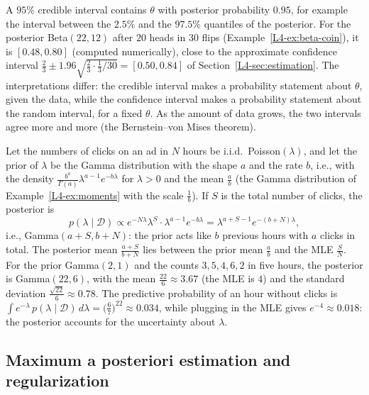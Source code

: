 \begin{example}\label{L4-ex:credible}
    A $95\%$ credible interval contains $\theta$ with posterior probability $0.95$, for example the interval between the $2.5\%$ and the $97.5\%$ quantiles of the posterior. For the posterior Beta$(22, 12)$ after $20$ heads in $30$ flips (Example~\ref{L4-ex:beta-coin}), it is $[0.48, 0.80]$ (computed numerically), close to the approximate confidence interval $\frac{2}{3} \pm 1.96\sqrt{\frac{2}{3} \cdot \frac{1}{3}/30} = [0.50, 0.84]$ of Section~\ref{L4-sec:estimation}. The interpretations differ: the credible interval makes a probability statement about $\theta$, given the data, while the confidence interval makes a probability statement about the random interval, for a fixed $\theta$. As the amount of data grows, the two intervals agree more and more (the Bernstein--von Mises theorem).
\end{example}

\begin{example}\label{L4-ex:gamma-poisson}
    Let the numbers of clicks on an ad in $N$ hours be i.i.d.\ Poisson$(\lambda)$, and let the prior of $\lambda$ be the Gamma distribution with the shape $a$ and the rate $b$, i.e., with the density $\frac{b^a}{\Gamma(a)}\lambda^{a-1}e^{-b\lambda}$ for $\lambda > 0$ and the mean $\frac{a}{b}$ (the Gamma distribution of Example~\ref{L4-ex:moments} with the scale $\frac{1}{b}$). If $S$ is the total number of clicks, the posterior is
    \[p(\lambda \mid \mathcal{D}) \propto e^{-N\lambda}\lambda^S \cdot \lambda^{a-1}e^{-b\lambda} = \lambda^{a + S - 1}e^{-(b + N)\lambda},\]
    i.e., Gamma$(a + S, b + N)$: the prior acts like $b$ previous hours with $a$ clicks in total. The posterior mean $\frac{a + S}{b + N}$ lies between the prior mean $\frac{a}{b}$ and the MLE $\frac{S}{N}$. For the prior Gamma$(2, 1)$ and the counts $3, 5, 4, 6, 2$ in five hours, the posterior is Gamma$(22, 6)$, with the mean $\frac{22}{6} \approx 3.67$ (the MLE is $4$) and the standard deviation $\frac{\sqrt{22}}{6} \approx 0.78$. The predictive probability of an hour without clicks is $\int e^{-\lambda}\,p(\lambda \mid \mathcal{D})\, d\lambda = \big(\frac{6}{7}\big)^{22} \approx 0.034$, while plugging in the MLE gives $e^{-4} \approx 0.018$: the posterior accounts for the uncertainty about $\lambda$.
\end{example}

\subsection{Maximum a posteriori estimation and regularization}

